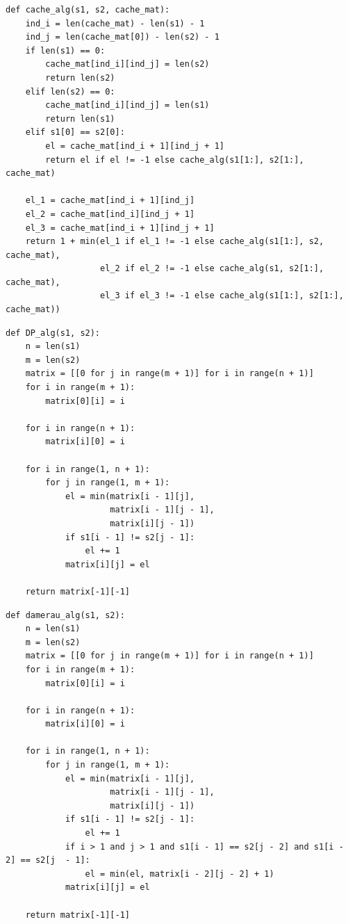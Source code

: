 \documentclass{article}
\begin{document}
\clearpage\begin{lstlisting}[style=python, label=lst:cache_alg,caption=Рекурсивный алгоритм с кэшированием]
def cache_alg(s1, s2, cache_mat):
    ind_i = len(cache_mat) - len(s1) - 1
    ind_j = len(cache_mat[0]) - len(s2) - 1
    if len(s1) == 0:
        cache_mat[ind_i][ind_j] = len(s2)
        return len(s2)
    elif len(s2) == 0:
        cache_mat[ind_i][ind_j] = len(s1)
        return len(s1)
    elif s1[0] == s2[0]:
        el = cache_mat[ind_i + 1][ind_j + 1]
        return el if el != -1 else cache_alg(s1[1:], s2[1:], cache_mat)

    el_1 = cache_mat[ind_i + 1][ind_j]
    el_2 = cache_mat[ind_i][ind_j + 1]
    el_3 = cache_mat[ind_i + 1][ind_j + 1]
    return 1 + min(el_1 if el_1 != -1 else cache_alg(s1[1:], s2, cache_mat),
                   el_2 if el_2 != -1 else cache_alg(s1, s2[1:], cache_mat),
                   el_3 if el_3 != -1 else cache_alg(s1[1:], s2[1:], cache_mat))
\end{lstlisting}

\begin{lstlisting}[style=python, label=lst:dp_alg,caption=Нерекурсивный алгоритм]
def DP_alg(s1, s2):
    n = len(s1)
    m = len(s2)
    matrix = [[0 for j in range(m + 1)] for i in range(n + 1)]
    for i in range(m + 1):
        matrix[0][i] = i

    for i in range(n + 1):
        matrix[i][0] = i

    for i in range(1, n + 1):
        for j in range(1, m + 1):
            el = min(matrix[i - 1][j],
                     matrix[i - 1][j - 1],
                     matrix[i][j - 1])
            if s1[i - 1] != s2[j - 1]:
                el += 1
            matrix[i][j] = el

    return matrix[-1][-1]
\end{lstlisting}

\begin{lstlisting}[style=python, label=lst:damerau_alg,caption=Нерекурсивный алгоритм Дамерау-Левенштейна]
def damerau_alg(s1, s2):
    n = len(s1)
    m = len(s2)
    matrix = [[0 for j in range(m + 1)] for i in range(n + 1)]
    for i in range(m + 1):
        matrix[0][i] = i

    for i in range(n + 1):
        matrix[i][0] = i

    for i in range(1, n + 1):
        for j in range(1, m + 1):
            el = min(matrix[i - 1][j],
                     matrix[i - 1][j - 1],
                     matrix[i][j - 1])
            if s1[i - 1] != s2[j - 1]:
                el += 1
            if i > 1 and j > 1 and s1[i - 1] == s2[j - 2] and s1[i - 2] == s2[j  - 1]:
                el = min(el, matrix[i - 2][j - 2] + 1)
            matrix[i][j] = el

    return matrix[-1][-1]
\end{lstlisting}
\end{document}
